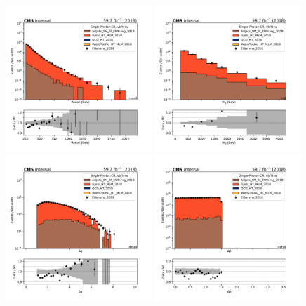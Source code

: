 \begin{figure}[htbp]
    \begin{center}
        \includegraphics[width=0.49\textwidth]{fig/datamc/cr_g_vbf/cr_g_vbf_recoil_losf_2018.pdf}
        \includegraphics[width=0.49\textwidth]{fig/datamc/cr_g_vbf/cr_g_vbf_mjj_losf_2018.pdf} \\
        \includegraphics[width=0.49\textwidth]{fig/datamc/cr_g_vbf/cr_g_vbf_detajj_losf_2018.pdf}
        \includegraphics[width=0.49\textwidth]{fig/datamc/cr_g_vbf/cr_g_vbf_dphijj_losf_2018.pdf}

\end{center}
\end{figure}
